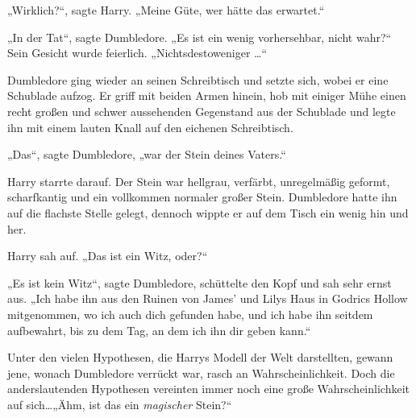 „Wirklich?“, sagte Harry. „Meine Güte, wer hätte das erwartet.“

„In der Tat“, sagte Dumbledore. „Es ist ein wenig vorhersehbar, nicht wahr?“ Sein Gesicht wurde feierlich. „Nichtsdestoweniger …“

Dumbledore ging wieder an seinen Schreibtisch und setzte sich, wobei er eine Schublade aufzog. Er griff mit beiden Armen hinein, hob mit einiger Mühe einen recht großen und schwer aussehenden Gegenstand aus der Schublade und legte ihn mit einem lauten Knall auf den eichenen Schreibtisch.

„Das“, sagte Dumbledore, „war der Stein deines Vaters.“

Harry starrte darauf. Der Stein war hellgrau, verfärbt, unregelmäßig geformt, scharfkantig und ein vollkommen normaler großer Stein. Dumbledore hatte ihn auf die flachste Stelle gelegt, dennoch wippte er auf dem Tisch ein wenig hin und her.

Harry sah auf. „Das ist ein Witz, oder?“

„Es ist kein Witz“, sagte Dumbledore, schüttelte den Kopf und sah sehr ernst aus. „Ich habe ihn aus den Ruinen von James’ und Lilys Haus in Godrics Hollow mitgenommen, wo ich auch dich gefunden habe, und ich habe ihn seitdem aufbewahrt, bis zu dem Tag, an dem ich ihn dir geben kann.“

Unter den vielen Hypothesen, die Harrys Modell der Welt darstellten, gewann jene, wonach Dumbledore verrückt war, rasch an Wahrscheinlichkeit. Doch die anderslautenden Hypothesen vereinten immer noch eine große Wahrscheinlichkeit auf sich…„Ähm, ist das ein \emph{magischer} Stein?“

